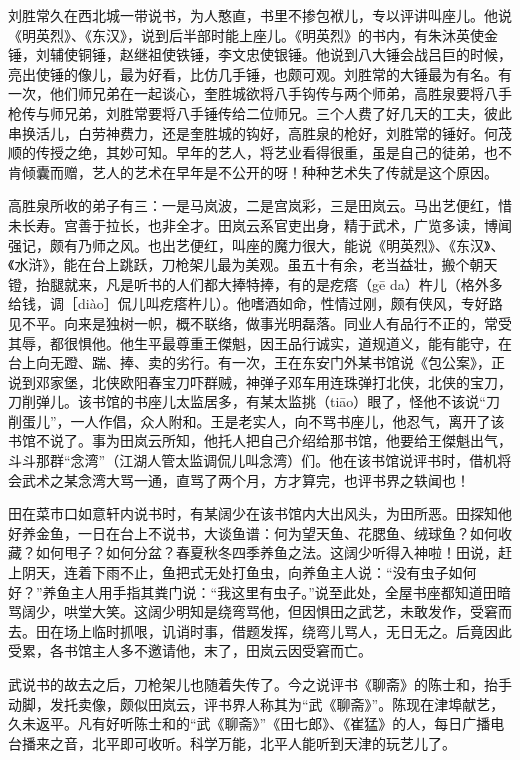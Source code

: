 \documentclass[12pt,UTF8]{ctexbook}
\begin{document}
刘胜常久在西北城一带说书，为人憨直，书里不掺包袱儿，专以评讲叫座儿。他说《明英烈》、《东汉》，说到后半部时能上座儿。《明英烈》的书内，有朱沐英使金锤，刘辅使铜锤，赵继祖使铁锤，李文忠使银锤。他说到八大锤会战吕巨的时候，亮出使锤的像儿，最为好看，比仿几手锤，也颇可观。刘胜常的大锤最为有名。有一次，他们师兄弟在一起谈心，奎胜城欲将八手钩传与两个师弟，高胜泉要将八手枪传与师兄弟，刘胜常要将八手锤传给二位师兄。三个人费了好几天的工夫，彼此串换活儿，白劳神费力，还是奎胜城的钩好，高胜泉的枪好，刘胜常的锤好。何茂顺的传授之绝，其妙可知。早年的艺人，将艺业看得很重，虽是自己的徒弟，也不肯倾囊而赠，艺人的艺术在早年是不公开的呀！种种艺术失了传就是这个原因。

高胜泉所收的弟子有三：一是马岚波，二是宫岚彩，三是田岚云。马出艺便红，惜未长寿。宫善于拉长，也非全才。田岚云系官吏出身，精于武术，广览多读，博闻强记，颇有乃师之风。也出艺便红，叫座的魔力很大，能说《明英烈》、《东汉》、《水浒》，能在台上跳跃，刀枪架儿最为美观。虽五十有余，老当益壮，搬个朝天镫，抬腿就来，凡是听书的人们都大捧特捧，有的是疙瘩（gē da）杵儿（格外多给钱，调［diào］侃儿叫疙瘩杵儿）。他嗜酒如命，性情过刚，颇有侠风，专好路见不平。向来是独树一帜，概不联络，做事光明磊落。同业人有品行不正的，常受其辱，都很惧他。他生平最尊重王傑魁，因王品行诚实，道规道义，能有能守，在台上向无蹬、踹、捧、卖的劣行。有一次，王在东安门外某书馆说《包公案》，正说到邓家堡，北侠欧阳春宝刀吓群贼，神弹子邓车用连珠弹打北侠，北侠的宝刀，刀削弹儿。该书馆的书座儿太监居多，有某太监挑（tiāo）眼了，怪他不该说“刀削蛋儿”，一人作倡，众人附和。王是老实人，向不骂书座儿，他忍气，离开了该书馆不说了。事为田岚云所知，他托人把自己介绍给那书馆，他要给王傑魁出气，斗斗那群“念湾”（江湖人管太监调侃儿叫念湾）们。他在该书馆说评书时，借机将会武术之某念湾大骂一通，直骂了两个月，方才算完，也评书界之轶闻也！

田在菜市口如意轩内说书时，有某阔少在该书馆内大出风头，为田所恶。田探知他好养金鱼，一日在台上不说书，大谈鱼谱：何为望天鱼、花腮鱼、绒球鱼？如何收藏？如何甩子？如何分盆？春夏秋冬四季养鱼之法。这阔少听得入神啦！田说，赶上阴天，连着下雨不止，鱼把式无处打鱼虫，向养鱼主人说：“没有虫子如何好？”养鱼主人用手指其粪门说：“我这里有虫子。”说至此处，全屋书座都知道田暗骂阔少，哄堂大笑。这阔少明知是绕弯骂他，但因惧田之武艺，未敢发作，受窘而去。田在场上临时抓哏，讥诮时事，借题发挥，绕弯儿骂人，无日无之。后竟因此受累，各书馆主人多不邀请他，末了，田岚云因受窘而亡。

武说书的故去之后，刀枪架儿也随着失传了。今之说评书《聊斋》的陈士和，抬手动脚，发托卖像，颇似田岚云，评书界人称其为“武《聊斋》”。陈现在津埠献艺，久未返平。凡有好听陈士和的“武《聊斋》”《田七郎》、《崔猛》的人，每日广播电台播来之音，北平即可收听。科学万能，北平人能听到天津的玩艺儿了。
\end{document}
